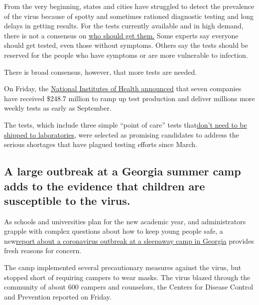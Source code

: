 From the very beginning, states and cities have struggled to detect the
prevalence of the virus because of spotty and sometimes rationed
diagnostic testing and long delays in getting results. For the tests
currently available and in high demand, there is not a consensus on
\href{https://www.nytimes.com/2020/07/31/health/coronavirus-test-ethics.html}{who
should get them.} Some experts say everyone should get tested, even
those without symptoms. Others say the tests should be reserved for the
people who have symptoms or are more vulnerable to infection.

There is broad consensus, however, that more tests are needed.

On Friday, the
\href{https://www.nih.gov/news-events/news-releases/nih-delivering-new-covid-19-testing-technologies-meet-us-demand}{National
Institutes of Health announced} that seven companies have received
\$248.7 million to ramp up test production and deliver millions more
weekly tests as early as September.

The tests, which include three simple ``point of care'' tests
that\href{https://www.nytimes.com/2020/07/06/health/fast-coronavirus-tests.html}{don't
need to be shipped to laboratories}, were selected as promising
candidates to address the serious shortages that have plagued testing
efforts since March.

\hypertarget{a-large-outbreak-at-a-georgia-summer-camp-adds-to-the-evidence-that-children-are-susceptible-to-the-virus}{%
\subsection{A large outbreak at a Georgia summer camp adds to the
evidence that children are susceptible to the
virus.}\label{a-large-outbreak-at-a-georgia-summer-camp-adds-to-the-evidence-that-children-are-susceptible-to-the-virus}}

As schools and universities plan for the new academic year, and
administrators grapple with complex questions about how to keep young
people safe, a
new\href{https://www.cdc.gov/mmwr/volumes/69/wr/mm6931e1.htm?s_cid=mm6931e1_w}{report
about a coronavirus outbreak at a sleepaway camp in Georgia} provides
fresh reasons for concern.

The camp implemented several precautionary measures against the virus,
but stopped short of requiring campers to wear masks. The virus blazed
through the community of about 600 campers and counselors, the Centers
for Disease Control and Prevention reported on Friday.

